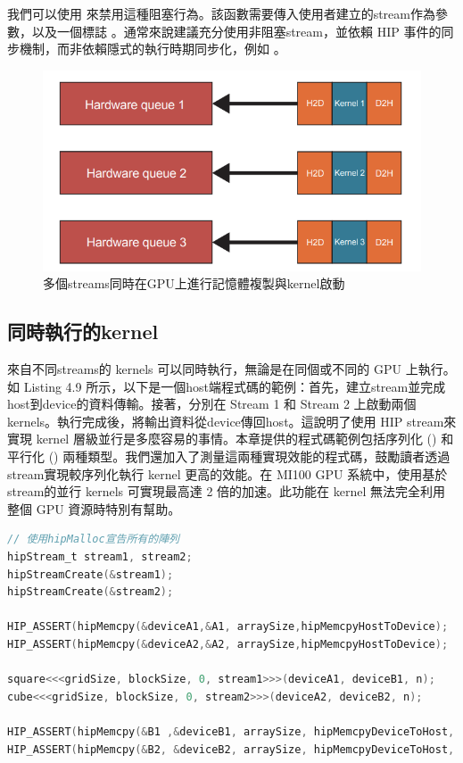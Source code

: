 我們可以使用  來禁用這種阻塞行為。該函數需要傳入使用者建立的stream作為參數，以及一個標誌 。通常來說建議充分使用非阻塞stream，並依賴 HIP 事件的同步機制，而非依賴隱式的執行時期同步化，例如 。

\begin{figure}[h]
    \centering
    \includegraphics[width=0.8\linewidth]{FileAusiliari/Screenshots/Figure4-1.png}
    \caption{多個streams同時在GPU上進行記憶體複製與kernel啟動}
    \label{fig:lds}
\end{figure}

\subsection{同時執行的kernel}

來自不同streams的 kernels 可以同時執行，無論是在同個或不同的 GPU 上執行。如 Listing 4.9 所示，以下是一個host端程式碼的範例：首先，建立stream並完成host到device的資料傳輸。接著，分別在 Stream 1 和 Stream 2 上啟動兩個kernels。執行完成後，將輸出資料從device傳回host。這說明了使用 HIP stream來實現 kernel 層級並行是多麼容易的事情。本章提供的程式碼範例包括序列化 () 和平行化 () 兩種類型。我們還加入了測量這兩種實現效能的程式碼，鼓勵讀者透過stream實現較序列化執行 kernel 更高的效能。在 MI100 GPU 系統中，使用基於stream的並行 kernels 可實現最高達 2 倍的加速。此功能在 kernel 無法完全利用整個 GPU 資源時特別有幫助。

\begin{lstlisting}[language=C, caption={使用HIP stream的同時kernel -- host端}, label={9th:example}]
// 使用hipMalloc宣告所有的陣列
hipStream_t stream1, stream2;
hipStreamCreate(&stream1);
hipStreamCreate(&stream2);

HIP_ASSERT(hipMemcpy(&deviceA1,&A1, arraySize,hipMemcpyHostToDevice);
HIP_ASSERT(hipMemcpy(&deviceA2,&A2, arraySize,hipMemcpyHostToDevice);

square<<<gridSize, blockSize, 0, stream1>>>(deviceA1, deviceB1, n);
cube<<<gridSize, blockSize, 0, stream2>>>(deviceA2, deviceB2, n);

HIP_ASSERT(hipMemcpy(&B1 ,&deviceB1, arraySize, hipMemcpyDeviceToHost, stream1);
HIP_ASSERT(hipMemcpy(&B2, &deviceB2, arraySize, hipMemcpyDeviceToHost, stream2);
\end{lstlisting}

